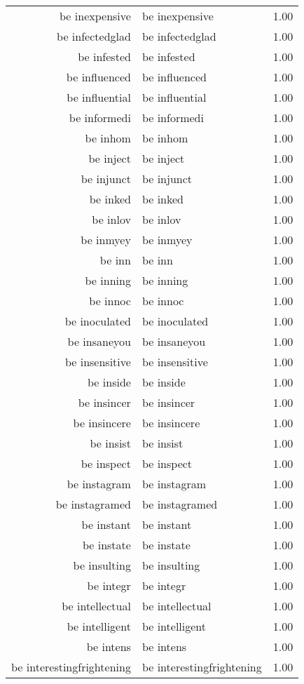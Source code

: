 \begin{table}[ht]
\begin{tabular}{rlr}
  be inexpensive & be inexpensive & 1.00 \\ 
  be infectedglad & be infectedglad & 1.00 \\ 
  be infested & be infested & 1.00 \\ 
  be influenced & be influenced & 1.00 \\ 
  be influential & be influential & 1.00 \\ 
  be informedi & be informedi & 1.00 \\ 
  be inhom & be inhom & 1.00 \\ 
  be inject & be inject & 1.00 \\ 
  be injunct & be injunct & 1.00 \\ 
  be inked & be inked & 1.00 \\ 
  be inlov & be inlov & 1.00 \\ 
  be inmyey & be inmyey & 1.00 \\ 
  be inn & be inn & 1.00 \\ 
  be inning & be inning & 1.00 \\ 
  be innoc & be innoc & 1.00 \\ 
  be inoculated & be inoculated & 1.00 \\ 
  be insaneyou & be insaneyou & 1.00 \\ 
  be insensitive & be insensitive & 1.00 \\ 
  be inside & be inside & 1.00 \\ 
  be insincer & be insincer & 1.00 \\ 
  be insincere & be insincere & 1.00 \\ 
  be insist & be insist & 1.00 \\ 
  be inspect & be inspect & 1.00 \\ 
  be instagram & be instagram & 1.00 \\ 
  be instagramed & be instagramed & 1.00 \\ 
  be instant & be instant & 1.00 \\ 
  be instate & be instate & 1.00 \\ 
  be insulting & be insulting & 1.00 \\ 
  be integr & be integr & 1.00 \\ 
  be intellectual & be intellectual & 1.00 \\ 
  be intelligent & be intelligent & 1.00 \\ 
  be intens & be intens & 1.00 \\ 
  be interestingfrightening & be interestingfrightening & 1.00 \\ 

\end{tabular}
\end{table}
